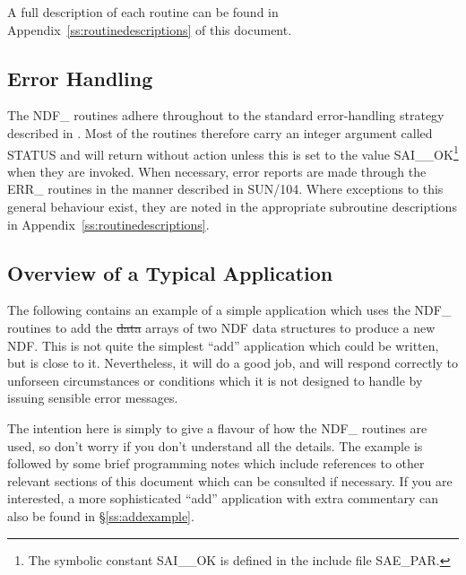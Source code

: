 A full description of each routine can be found in
Appendix~\ref{ss:routinedescriptions} of this document.

\subsection{\label{ss:errorhandling}Error Handling}

The NDF\_ routines adhere throughout to the standard error-handling
strategy described in .  Most of the
routines therefore carry an integer  argument called STATUS and will
return without action unless this is set to the value
SAI\_\_OK\footnote{The symbolic constant SAI\_\_OK is defined in the
include file SAE\_PAR.} when they are invoked.  When necessary, error
reports are made through the ERR\_ routines in the manner described in
SUN/104.  Where exceptions to this general behaviour exist, they are
noted in the appropriate subroutine descriptions in
Appendix~\ref{ss:routinedescriptions}.

\subsection{\label{ss:applicationoverview}Overview of a Typical Application}

The following contains an example of a simple application which uses the
NDF\_ routines to add the \st{data\/} arrays of two NDF data structures to
produce a new NDF. 
This is not quite the simplest ``add'' application which could be written,
but is close to it. 
Nevertheless, it will do a good job, and will respond correctly to unforseen
circumstances or conditions which it is not designed to handle by issuing
sensible error messages. 

The intention here is simply to give a flavour of how the NDF\_ routines are
used, so don't worry if you don't understand all the details. 
The example is followed by some brief programming notes which include 
references to other relevant sections of this document which can be
consulted if necessary. 
If you are interested, a more sophisticated ``add'' application with extra
commentary can also be found in \S\ref{ss:addexample}. 

